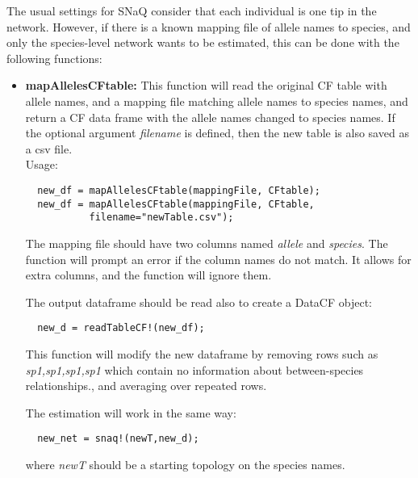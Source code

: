 \documentclass[12pt]{article}
\begin{document}
The usual settings for SNaQ consider that each individual is one tip
in the network. However, if there is a known mapping file of allele
names to species, and only the species-level network wants to be
estimated, this can be done with the following functions:
\begin{itemize}
\item{\textbf{mapAllelesCFtable:} This function will read the original
  CF table with allele names, and a mapping file matching allele names
to species names, and return a CF data frame with the allele names
changed to species names. If the optional argument \textit{filename} is defined,
then the new table is also saved as a csv file.
\\Usage:
\begin{lstlisting}
  new_df = mapAllelesCFtable(mappingFile, CFtable);
  new_df = mapAllelesCFtable(mappingFile, CFtable,
           filename="newTable.csv");
\end{lstlisting}

The mapping file should have two columns named \textit{allele} and
\textit{species}. The function will prompt an error if the column
names do not match. It allows for extra columns, and the function will
ignore them.

The output dataframe should be read also to create a DataCF object:
\begin{lstlisting}
  new_d = readTableCF!(new_df);
\end{lstlisting}
This function will modify the new dataframe by removing rows such as
\textit{sp1,sp1,sp1,sp1} which contain no information about
between-species relationships., and averaging over repeated rows.

The estimation will work in the same way:
\begin{lstlisting}
  new_net = snaq!(newT,new_d);
\end{lstlisting}
where \textit{newT} should be a starting topology on the species
names.

}
\end{itemize}
\end{document}
